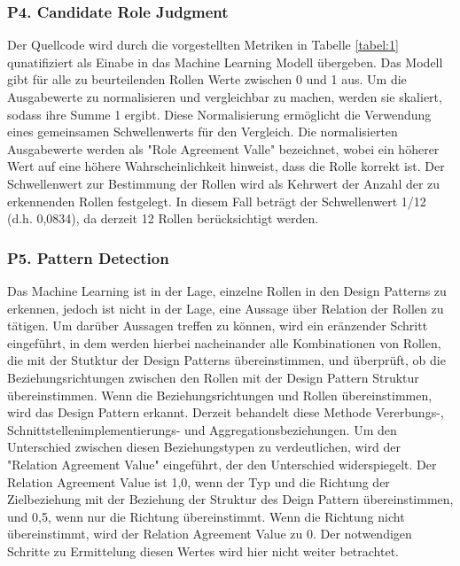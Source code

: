 \documentclass[conference]{IEEEtran}
\begin{document}
\subsubsection*{P4. Candidate Role Judgment}

Der Quellcode wird durch die vorgestellten Metriken in Tabelle \ref*{tabel:1} qunatifiziert als Einabe in das Machine Learning Modell übergeben. Das Modell gibt für alle zu beurteilenden Rollen Werte zwischen 0 und 1 aus.
Um die Ausgabewerte zu normalisieren und vergleichbar zu machen, werden sie skaliert, sodass ihre Summe 1 ergibt\cite[p. 5]{dodmetrics}. Diese Normalisierung ermöglicht die Verwendung eines gemeinsamen Schwellenwerts für den Vergleich. Die normalisierten Ausgabewerte werden als "Role Agreement Valle" bezeichnet, wobei ein höherer Wert auf eine höhere Wahrscheinlichkeit hinweist, dass die Rolle korrekt ist.
Der Schwellenwert zur Bestimmung der Rollen wird als Kehrwert der Anzahl der zu erkennenden Rollen festgelegt. In diesem Fall beträgt der Schwellenwert 1/12 (d.h. 0,0834), da derzeit 12 Rollen berücksichtigt werden.

\subsubsection*{P5. Pattern Detection}

Das Machine Learning ist in der Lage, einzelne Rollen in den Design Patterns zu erkennen, jedoch ist nicht in der Lage, eine Aussage über Relation der Rollen zu tätigen. Um darüber Aussagen treffen zu können, wird ein eränzender Schritt eingeführt, in dem werden hierbei nacheinander alle Kombinationen von Rollen, die mit der Stutktur der Design Patterns übereinstimmen, und überprüft, ob die Beziehungsrichtungen zwischen den Rollen mit der Design Pattern Struktur übereinstimmen.
Wenn die Beziehungsrichtungen und Rollen übereinstimmen, wird das Design Pattern erkannt. Derzeit behandelt diese Methode Vererbungs-, Schnittstellenimplementierungs- und Aggregationsbeziehungen. Um den Unterschied zwischen diesen Beziehungstypen zu verdeutlichen, wird der "Relation Agreement Value" eingeführt, der den Unterschied widerspiegelt. Der Relation Agreement Value ist 1,0, wenn der Typ und die Richtung der Zielbeziehung mit der Beziehung der Struktur des Deign Pattern übereinstimmen, und 0,5, wenn nur die Richtung übereinstimmt. Wenn die Richtung nicht übereinstimmt, wird der Relation Agreement Value zu 0.
Der notwendigen Schritte zu Ermittelung diesen Wertes wird hier nicht weiter betrachtet.
\end{document}
